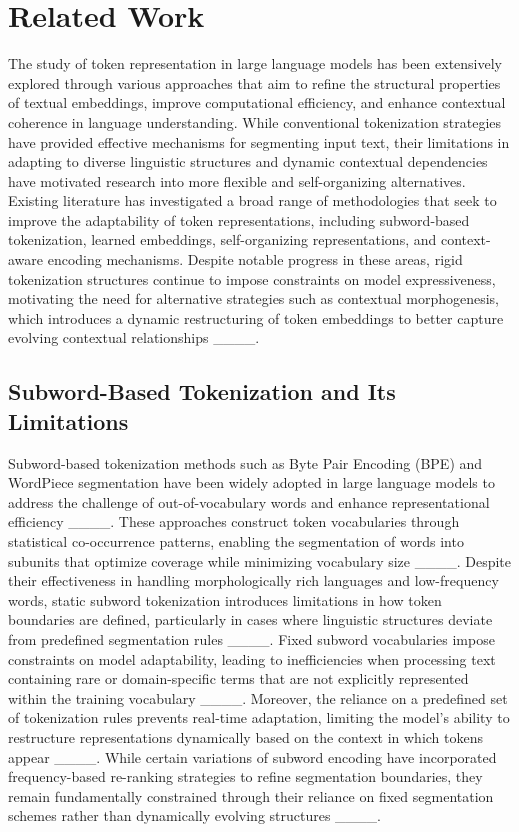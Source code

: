 \section{Related Work}
The study of token representation in large language models has been extensively explored through various approaches that aim to refine the structural properties of textual embeddings, improve computational efficiency, and enhance contextual coherence in language understanding. While conventional tokenization strategies have provided effective mechanisms for segmenting input text, their limitations in adapting to diverse linguistic structures and dynamic contextual dependencies have motivated research into more flexible and self-organizing alternatives. Existing literature has investigated a broad range of methodologies that seek to improve the adaptability of token representations, including subword-based tokenization, learned embeddings, self-organizing representations, and context-aware encoding mechanisms. Despite notable progress in these areas, rigid tokenization structures continue to impose constraints on model expressiveness, motivating the need for alternative strategies such as contextual morphogenesis, which introduces a dynamic restructuring of token embeddings to better capture evolving contextual relationships ____.

\subsection{Subword-Based Tokenization and Its Limitations}

Subword-based tokenization methods such as Byte Pair Encoding (BPE) and WordPiece segmentation have been widely adopted in large language models to address the challenge of out-of-vocabulary words and enhance representational efficiency ____. These approaches construct token vocabularies through statistical co-occurrence patterns, enabling the segmentation of words into subunits that optimize coverage while minimizing vocabulary size ____. Despite their effectiveness in handling morphologically rich languages and low-frequency words, static subword tokenization introduces limitations in how token boundaries are defined, particularly in cases where linguistic structures deviate from predefined segmentation rules ____. Fixed subword vocabularies impose constraints on model adaptability, leading to inefficiencies when processing text containing rare or domain-specific terms that are not explicitly represented within the training vocabulary ____. Moreover, the reliance on a predefined set of tokenization rules prevents real-time adaptation, limiting the model’s ability to restructure representations dynamically based on the context in which tokens appear ____. While certain variations of subword encoding have incorporated frequency-based re-ranking strategies to refine segmentation boundaries, they remain fundamentally constrained through their reliance on fixed segmentation schemes rather than dynamically evolving structures ____.

